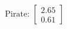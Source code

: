 \documentclass[preview]{standalone}
\begin{document}
\begin{align*}
\text{Pirate: } \begin{bmatrix} 2.65 \\ 0.61 \end{bmatrix}
\end{align*}
\end{document}
